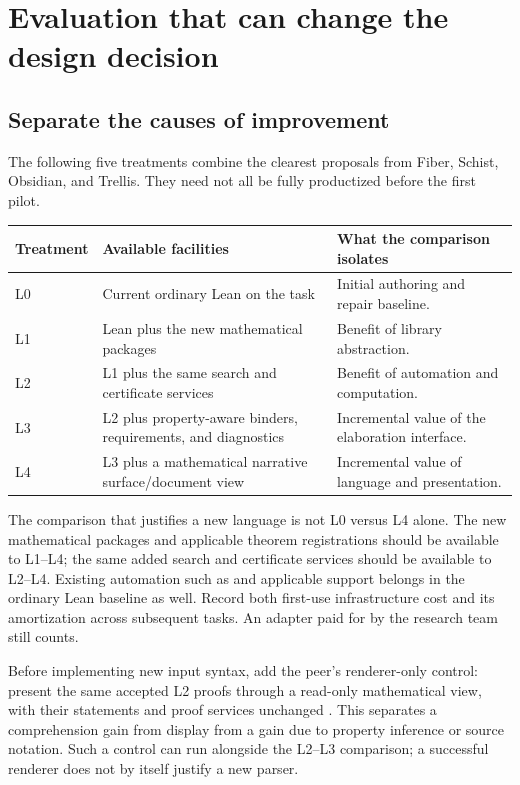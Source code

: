 \documentclass[11pt,letterpaper]{article}
\newcommand{\code}[1]{\texttt{\detokenize{#1}}}
\theoremstyle{definition}\newtheorem{definition}[proposition]{Definition}
\theoremstyle{remark}\newtheorem{remark}[proposition]{Remark}
\begin{document}
\section{Evaluation that can change the design decision}\label{sec:evaluation}

\subsection{Separate the causes of improvement}
The following five treatments combine the clearest proposals from Fiber,
Schist, Obsidian, and Trellis. They need not all be fully productized before
the first pilot.
\begin{center}\small
\begin{tabularx}{\textwidth}{@{}l Y Y@{}}
\toprule Treatment & Available facilities & What the comparison isolates\\\midrule
L0 & Current ordinary Lean on the task & Initial authoring and repair baseline.\\
L1 & Lean plus the new mathematical packages & Benefit of library abstraction.\\
L2 & L1 plus the same search and certificate services & Benefit of automation and computation.\\
L3 & L2 plus property-aware binders, requirements, and diagnostics & Incremental value of the elaboration interface.\\
L4 & L3 plus a mathematical narrative surface/document view & Incremental value of language and presentation.\\
\bottomrule
\end{tabularx}
\end{center}

The comparison that justifies a new language is not L0 versus L4 alone.
The new mathematical packages and applicable theorem registrations should be
available to L1--L4; the same added search and certificate services should be
available to L2--L4. Existing automation such as \code{fun_prop} and applicable
\code{mvcgen} support belongs in the ordinary Lean baseline as well.
Record both first-use infrastructure cost and its amortization across
subsequent tasks. An adapter paid for by the research team still counts.

Before implementing new input syntax, add the peer's renderer-only control:
present the same accepted L2 proofs through a read-only mathematical view,
with their statements and proof services unchanged \cite{obsidian,round3-peer}.
This separates a comprehension gain from display from a gain due to property
inference or source notation. Such a control can run alongside the L2--L3
comparison; a successful renderer does not by itself justify a new parser.
\end{document}

